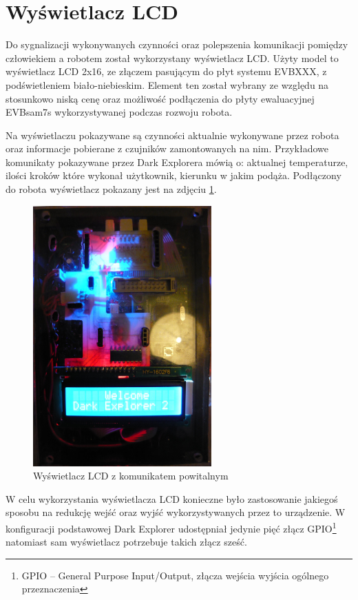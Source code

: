 \section{Wyświetlacz LCD}
\label{sec:lcd}
Do sygnalizacji wykonywanych czynności oraz polepszenia komunikacji pomiędzy
człowiekiem a robotem został wykorzystany wyświetlacz LCD. Użyty model to
wyświetlacz LCD 2x16, ze złączem pasującym do płyt systemu EVBXXX, z
podświetleniem biało-niebieskim. Element ten został wybrany ze względu na
stosunkowo niską cenę oraz możliwość podłączenia do płyty ewaluacyjnej EVBsam7s
wykorzystywanej podczas rozwoju robota.

Na wyświetlaczu pokazywane są czynności aktualnie wykonywane przez robota oraz
informacje pobierane z czujników zamontowanych na nim. Przykładowe komunikaty
pokazywane przez Dark Explorera mówią o: aktualnej temperaturze, ilości kroków
które wykonał użytkownik, kierunku w jakim podąża. Podłączony do robota
wyświetlacz pokazany jest na zdjęciu \ref{fig:LCD}.

\begin{figure}[!ht]
 \centering
 \includegraphics[height=100mm]{../images/ch04/lcd_welcome.jpg}
 \caption{Wyświetlacz LCD z komunikatem powitalnym}
 \label{fig:LCD}
\end{figure}

W celu wykorzystania wyświetlacza LCD konieczne było zastosowanie jakiegoś
sposobu na redukcję wejść oraz wyjść wykorzystywanych przez to urządzenie. W
konfiguracji podstawowej Dark Explorer udostępniał jedynie pięć złącz
GPIO\footnote{GPIO -- General Purpose Input/Output, złącza wejścia wyjścia
ogólnego przeznaczenia} natomiast sam wyświetlacz potrzebuje takich złącz sześć.

